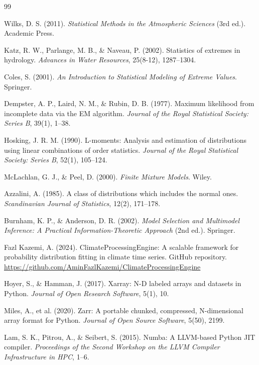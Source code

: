 \documentclass[12pt,a4paper,twocolumn]{article}
\begin{document}
\begin{thebibliography}{99}

Wilks, D. S. (2011). \textit{Statistical Methods in the Atmospheric Sciences} (3rd ed.). Academic Press.

Katz, R. W., Parlange, M. B., \& Naveau, P. (2002). Statistics of extremes in hydrology. \textit{Advances in Water Resources}, 25(8-12), 1287–1304.

Coles, S. (2001). \textit{An Introduction to Statistical Modeling of Extreme Values}. Springer.

Dempster, A. P., Laird, N. M., \& Rubin, D. B. (1977). Maximum likelihood from incomplete data via the EM algorithm. \textit{Journal of the Royal Statistical Society: Series B}, 39(1), 1–38.

Hosking, J. R. M. (1990). L-moments: Analysis and estimation of distributions using linear combinations of order statistics. \textit{Journal of the Royal Statistical Society: Series B}, 52(1), 105–124.

McLachlan, G. J., \& Peel, D. (2000). \textit{Finite Mixture Models}. Wiley.

Azzalini, A. (1985). A class of distributions which includes the normal ones. \textit{Scandinavian Journal of Statistics}, 12(2), 171–178.

Burnham, K. P., \& Anderson, D. R. (2002). \textit{Model Selection and Multimodel Inference: A Practical Information-Theoretic Approach} (2nd ed.). Springer.

Fazl Kazemi, A. (2024). ClimateProcessingEngine: A scalable framework for probability distribution fitting in climate time series. GitHub repository. \url{https://github.com/AminFazlKazemi/ClimateProcessingEngine}

Hoyer, S., \& Hamman, J. (2017). Xarray: N-D labeled arrays and datasets in Python. \textit{Journal of Open Research Software}, 5(1), 10.

Miles, A., et al. (2020). Zarr: A portable chunked, compressed, N-dimensional array format for Python. \textit{Journal of Open Source Software}, 5(50), 2199.

Lam, S. K., Pitrou, A., \& Seibert, S. (2015). Numba: A LLVM-based Python JIT compiler. \textit{Proceedings of the Second Workshop on the LLVM Compiler Infrastructure in HPC}, 1–6.

\end{thebibliography}
\end{document}
